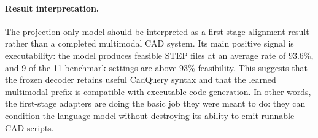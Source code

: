 \documentclass{article}
\begin{document}
\begin{table}[t]
\centering
\caption{Evaluation results. STEP feasibility and IoU are percentages; higher is better. CAD-Coder is the image-only baseline and CAD-Recode is the point-cloud-only baseline.}
\label{tab:main_results}
\end{table}

\paragraph{Result interpretation.}
The projection-only model should be interpreted as a first-stage alignment result rather than a completed multimodal CAD system. Its main positive signal is executability: the model produces feasible STEP files at an average rate of 93.6\%, and 9 of the 11 benchmark settings are above 93\% feasibility. This suggests that the frozen decoder retains useful CadQuery syntax and that the learned multimodal prefix is compatible with executable code generation. In other words, the first-stage adapters are doing the basic job they were meant to do: they can condition the language model without destroying its ability to emit runnable CAD scripts.
\end{document}
